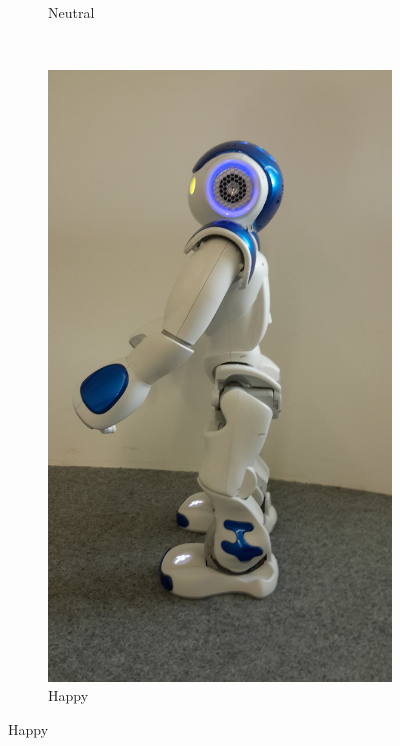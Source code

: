 \documentclass[a4paper, 10pt, conference]{ieeeconf}      %
\begin{document}
\begin{figure}
\begin{subfigure}[b]{0.18\textwidth}
                \caption{Neutral}
                \label{fig:neutral}
        \end{subfigure}
        ~ %
        \begin{subfigure}[b]{0.18\textwidth}
                \includegraphics[width=\textwidth]{../dissertation/figures/happy.jpg}
                \caption{Happy}
                \label{fig:happy}

\end{subfigure}
\end{figure}
\end{document}
